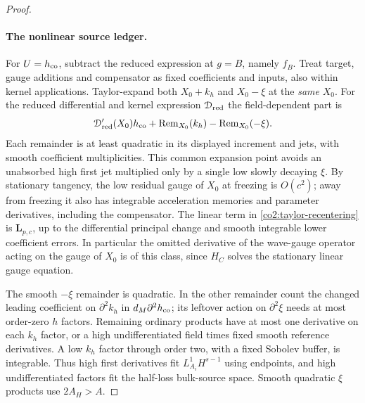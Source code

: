 \begin{proof}
\paragraph{The nonlinear source ledger.}
For $U=h_{\rm co}$, subtract the reduced expression at $g=B$, namely $f_B$.
Treat target, gauge additions and compensator as fixed coefficients and
inputs, also within kernel applications.  Taylor-expand both
$X_0+k_h$ and $X_0-\xi$ at the \emph{same} $X_0$.  For the reduced
differential and kernel expression $\mathcal D_{\rm red}$ the field-dependent
part is
\begin{equation}\label{co2:taylor-recentering}
 \mathcal D_{\rm red}'(X_0)h_{\rm co}
       +\operatorname{Rem}_{X_0}(k_h)
       -\operatorname{Rem}_{X_0}(-\xi).
\end{equation}
Each remainder is at least quadratic in its displayed increment and jets,
with smooth coefficient multiplicities.  This common expansion point avoids
an unabsorbed high first jet multiplied only by a single low slowly decaying
$\xi$.  By stationary tangency, the low residual gauge of $X_0$ at freezing
is $O(c^2)$; away from freezing it also has integrable acceleration memories
and parameter derivatives, including the compensator.  The linear term in
\eqref{co2:taylor-recentering} is $\mathbf L_{p,c}$, up to the differential
principal change and smooth integrable lower coefficient errors.  In
particular the omitted derivative of the wave-gauge operator acting on the
gauge of $X_0$ is of this class, since $H_C$ solves the stationary linear
gauge equation.

The smooth $-\xi$ remainder is quadratic.  In the other remainder count the
changed leading coefficient on $\partial^2k_h$ in
$d_M\partial^2h_{\rm co}$; its leftover action on $\partial^2\xi$ needs
at most order-zero $h$ factors.  Remaining ordinary products have at most
one derivative on each $k_h$ factor, or a high undifferentiated field times
fixed smooth reference derivatives.  A low $k_h$ factor through order two,
with a fixed Sobolev buffer, is integrable.  Thus high first derivatives fit
$L^1_{A_i}H^{s-1}$ using endpoints, and high undifferentiated factors fit the
half-loss bulk-source space.  Smooth quadratic $\xi$ products use
$2A_H>A$.


\end{proof}
